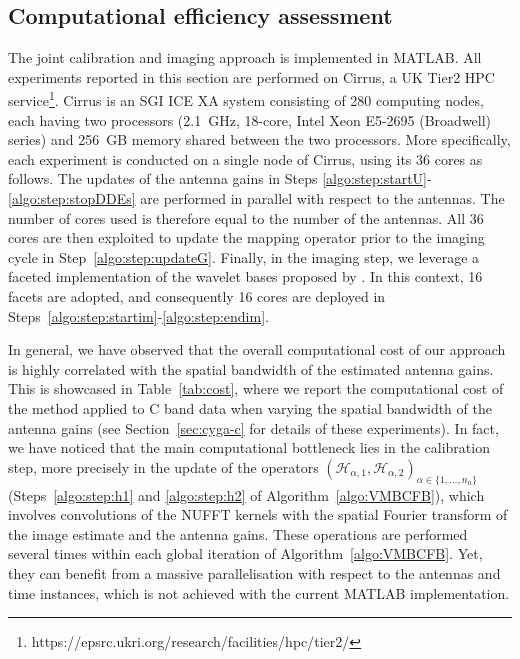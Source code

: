 \documentclass[fleqn,usenatbib]{mnras}
\newcommand{\Hc}{\ensuremath{\mathcal{H}}}
\begin{document}
\subsection{Computational efficiency assessment}%
The joint calibration and imaging approach is implemented in  \mbox{MATLAB}. All experiments reported in this section are performed on Cirrus, a UK Tier2 HPC service\footnote{{https://epsrc.ukri.org/research/facilities/hpc/tier2/}}. Cirrus is an SGI ICE XA system consisting of 280 computing nodes, each having two processors (2.1~GHz, 18-core, Intel Xeon E5-2695 (Broadwell) series) and 256~GB memory shared between the two processors. More specifically, each experiment is conducted on a single node of Cirrus, using its 36 cores as follows. The updates of the antenna gains in Steps \ref{algo:step:startU}-\ref{algo:step:stopDDEs} are performed in parallel with respect to the antennas. The number of cores used is therefore equal to the number of the antennas. All 36 cores are then exploited to update the mapping operator prior to the imaging cycle in Step~\ref{algo:step:updateG}. Finally, in the imaging step, we leverage a faceted implementation of the wavelet bases proposed by \citet{Prusa2012}. In this context, 16 facets are adopted, and consequently 16 cores are deployed in Steps~\ref{algo:step:startim}-\ref{algo:step:endim}. 


In general, we have observed that the overall computational cost of our approach is highly correlated with the spatial {bandwidth} of the estimated antenna gains. This is showcased in Table~\ref{tab:cost}, where we report the computational cost of the method applied to C band data when varying the spatial bandwidth of the antenna gains (see Section~\ref{sec:cyga-c} for details of these experiments). In fact, we have noticed that the main computational bottleneck lies in the calibration step, more precisely in the update of the operators $\left(\Hc_{\alpha,1},\Hc_{\alpha,2}\right)_{\alpha \in \{1,\dots,n_a\}}$ (Steps~\ref{algo:step:h1} and \ref{algo:step:h2} of Algorithm~\ref{algo:VMBCFB}), which involves convolutions of the NUFFT kernels with the spatial Fourier transform of the image estimate and the antenna gains. These operations are performed several times within each global iteration of Algorithm~\ref{algo:VMBCFB}. Yet, they can benefit from a massive parallelisation with respect to the antennas and time instances, which is not achieved with the current \mbox{MATLAB} implementation.
\end{document}
